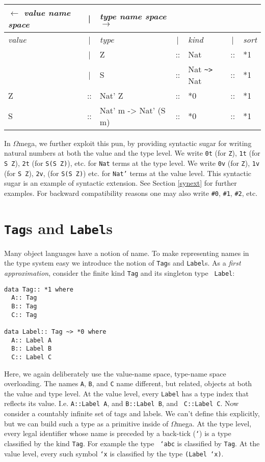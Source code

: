 \documentclass[11pt,twoside]{article}
\newcommand{\om}{$\Omega$mega}
\begin{document}
\vspace*{.15in}
{\tt
\begin{tabular}{|lclclcl|} \hline
  $\leftarrow$     {\it {\tiny value name space}}&|& {\it {\tiny type name space $\rightarrow$}} & &  && \\ \hline
{\em value}&|& {\em type} &|&  {\em kind} &|& {\em sort} \\ \hline
     & |& Z        &::& Nat &::& *1 \\
     & |& S        &::& Nat \verb+~>+ Nat &::& *1 \\   \hline
Z &::& Nat' Z &::& *0 &::& *1 \\
S &::& Nat' m -> Nat' (S m) &::& *0 &::& *1 \\
\hline
\end{tabular}}
\vspace*{.15in}


In \om, we further exploit this pun, by providing syntactic sugar for writing
natural numbers at both the value and the type level. We write {\tt 0t} (for
{\tt Z}), {\tt 1t} (for {\tt S Z}), {\tt 2t} (for {\tt S(S Z)}), etc. for
{\tt Nat} terms at the type level. We write {\tt 0v} (for {\tt Z}), {\tt 1v}
(for {\tt S Z}), {\tt 2v}, (for {\tt S(S Z)}) etc. for {\tt Nat'}
terms at the value level. This syntactic sugar is an example of
syntactic extension. See Section \ref{synext} for further examples.
For backward compatibility reasons one may also write {\tt \#0},
{\tt \#1}, {\tt \#2}, etc.

\section {{\tt Tag}s and {\tt Label}s} \label{tag}

Many object languages have a notion of name. To make representing names in the
type system easy we introduce the notion of {\tt Tag}s and {\tt Label}s. As a {\em first
approximation}, consider the finite kind {\tt Tag} and its singleton type {\tt
Label}:

\begin{verbatim}
data Tag:: *1 where
  A:: Tag
  B:: Tag
  C:: Tag

data Label:: Tag ~> *0 where
  A:: Label A
  B:: Label B
  C:: Label C
\end{verbatim}

Here, we again deliberately use the value-name space, type-name space
overloading. The names {\tt A}, {\tt B}, and {\tt C} name different,
but related, objects at both the value and type level.
At the value level, every {\tt Label} has a type index
that reflects its value. I.e. {\tt A::Label A}, and {\tt B::Label B}, and {\tt
C::Label C}. Now consider a countably infinite set of tags and labels. We can't
define this explicitly, but we can build such a type as a primitive inside of
\om. At the type level, every legal identifier whose name is preceded by a
back-tick ({\tt `}) is a type classified by the kind {\tt Tag}. For example the type {\tt
`abc} is classified by {\tt Tag}. At the value level, every such symbol {\tt `x} is classified
by the type {\tt (Label `x)}.
\end{document}
